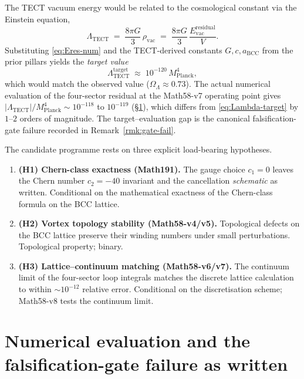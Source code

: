 The TECT vacuum energy would be related to the cosmological constant
via the Einstein equation,
\begin{equation}\label{eq:einstein-Lambda}
  \Lambda_{\mathrm{TECT}}
  \;=\; \frac{8\pi G}{3}\,\rho_{\mathrm{vac}}
  \;=\; \frac{8\pi G}{3}\,
        \frac{E_{\mathrm{vac}}^{\mathrm{residual}}}{V}.
\end{equation}
Substituting \eqref{eq:Eres-num} and the TECT-derived constants
$G, c, a_{\mathrm{BCC}}$ from the prior pillars yields the
\emph{target value}
\begin{equation}\label{eq:Lambda-target}
  \Lambda_{\mathrm{TECT}}^{\mathrm{target}}
  \;\approx\; 10^{-120}\,M_{\mathrm{Planck}}^4,
\end{equation}
which would match the observed value
($\Omega_\Lambda \approx 0.73$). The actual numerical evaluation of
the four-sector residual at the Math58-v7 operating point gives
$|\Lambda_{\mathrm{TECT}}|/M_{\mathrm{Planck}}^4 \sim 10^{-118}$ to
$10^{-119}$ (\S\ref{sec:numerics}), which differs from
\eqref{eq:Lambda-target} by $1$--$2$ orders of magnitude. The
target--evaluation gap is the canonical falsification-gate failure
recorded in Remark~\ref{rmk:gate-fail}.

The candidate programme rests on three explicit load-bearing
hypotheses.
\begin{enumerate}
  \item \textbf{(H1) Chern-class exactness (Math191).} The gauge
    choice $c_1 = 0$ leaves the Chern number $c_2 = -40$ invariant
    and the cancellation \emph{schematic} as written. Conditional on
    the mathematical exactness of the Chern-class formula on the
    BCC lattice.
  \item \textbf{(H2) Vortex topology stability (Math58-v4/v5).}
    Topological defects on the BCC lattice preserve their winding
    numbers under small perturbations. Topological property; binary.
  \item \textbf{(H3) Lattice--continuum matching (Math58-v6/v7).}
    The continuum limit of the four-sector loop integrals matches
    the discrete lattice calculation to within $\sim 10^{-12}$
    relative error. Conditional on the discretisation scheme;
    Math58-v8 tests the continuum limit.
\end{enumerate}

\section{Numerical evaluation and the
falsification-gate failure as written}\label{sec:numerics}

